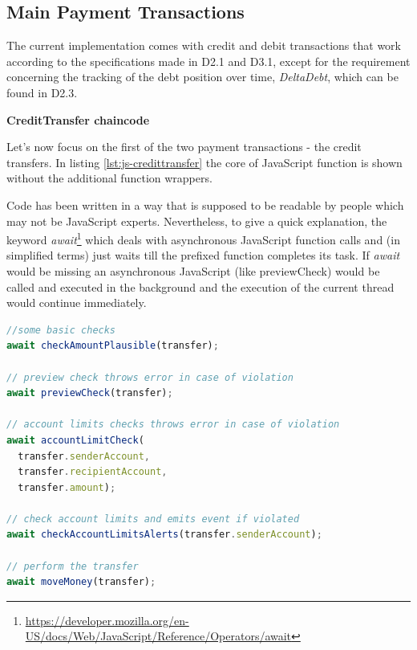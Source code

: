 \subsection{Main Payment Transactions}
\label{subsec:main-payment-transactions}
The current implementation comes with credit and debit transactions that work according to the specifications made in D2.1 and D3.1, except for the requirement concerning the tracking of the debt position over time, \textit{DeltaDebt}, which can be found in D2.3.

\textbf{CreditTransfer chaincode}

Let's now focus on the first of the two payment transactions - the credit transfers. In listing \ref{lst:js-credittransfer} the core of JavaScript function is shown without the additional function wrappers.

Code has been written in a way that is supposed to be readable by people which may not be JavaScript experts. Nevertheless, to give a quick explanation, the keyword \textit{await}\footnote{\url{https://developer.mozilla.org/en-US/docs/Web/JavaScript/Reference/Operators/await}} which deals with asynchronous JavaScript function calls and (in simplified terms) just waits till the prefixed function completes its task. If \textit{await} would be missing an asynchronous JavaScript (like previewCheck) would be called and executed in the background and the execution of the current thread would continue immediately.

\begin{center}
\begin{minipage}{0.8\textwidth}
\small
\begin{lstlisting}[language=javascript,firstnumber=1,caption={\bf\small CreditTransfer JavaScript}, captionpos=b,label=lst:js-credittransfer]
//some basic checks
await checkAmountPlausible(transfer);

// preview check throws error in case of violation
await previewCheck(transfer);

// account limits checks throws error in case of violation
await accountLimitCheck(
  transfer.senderAccount,
  transfer.recipientAccount,
  transfer.amount);

// check account limits and emits event if violated
await checkAccountLimitsAlerts(transfer.senderAccount);

// perform the transfer
await moveMoney(transfer);
\end{lstlisting}
\end{minipage}
\end{center}


